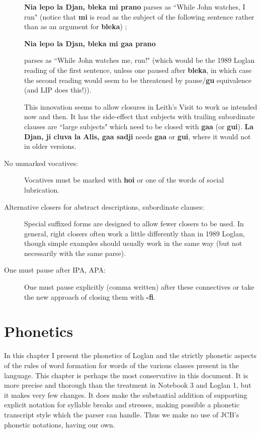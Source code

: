 \documentclass[12pt]{book}
\begin{document}
\begin{description}
{\bf Nia lepo la Djan, bleka mi prano} parses as ``While John watches, I run" (notice that {\bf mi} is read as the subject of the following sentence rather than as an argument for {\bf bleka}) ;  \begin{center}{\bf Nia lepo la Djan, bleka mi gaa prano}\end{center} parses as ``While John watches me, run!" (which would be the 1989 Loglan reading of the first sentence, unless one paused after {\bf bleka}, in which case the second reading would seem to be threatened  by pause/{\bf gu} equivalence (and LIP does this!)).

This innovation seems to allow closures in Leith's Visit to work as intended now and then.  It has the side-effect that subjects with trailing subordinate clauses are ``large subjects" which need to be closed with {\bf gaa} (or {\bf gui}).  {\bf La Djan, ji cluva la Alis, gaa sadji} needs {\bf gaa} or {\bf gui}, where it would not in older versions.

\item[No unmarked vocatives:]  Vocatives must be marked with {\bf hoi} or one of the words of social lubrication.

\item[Alternative closers for abstract descriptions, subordinate clauses:]  Special suffixed forms are designed to allow fewer closers to be used.  In general, right closers often work a little differently than in 1989 Loglan, though simple examples should usually work in the same way (but not necessarily with the same parse).

\item[One must pause after IPA, APA:]  One must pause explicitly (comma written) after these connectives or take the new approach of closing them with {\bf -fi}.

\end{description}

\chapter{Phonetics}

In this chapter I present the phonetics of Loglan and the strictly phonetic aspects of the rules of word formation for words of the various classes present in the language.  This chapter is perhaps the  most conservative in this document.  It is more precise and thorough than the treatment in Notebook 3 and Loglan 1, but it makes very few changes.  It does make the substantial addition of supporting explicit notation for syllable breaks and stresses, making possible a phonetic transcript style which the parser can handle.  Thus we make no use of JCB's phonetic notations, having our own.
\end{document}
